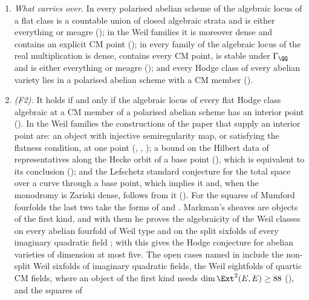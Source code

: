 \begin{theorem}\label{thm:twostand}
\leavevmode
\begin{enumerate}[label=\textup{(\roman*)},leftmargin=2.6em,itemsep=3pt]
\item \emph{What carries over.} In every polarised abelian scheme of
   the algebraic locus of a flat class is a
  countable union of closed algebraic strata and is either everything or
  meagre (); in the Weil families it is moreover dense
  and contains an explicit CM point (\cite[Theorem~1.1]{paperI}); in every family of
   the algebraic locus of the real multiplication is dense,
  contains every CM point, is stable under $\Gamma_{\QQ}$ and is either
  everything or meagre (); and every Hodge class of every
  abelian variety lies in a polarised abelian scheme with a CM member
  ().
\item \emph{(F2).} It holds if and only if the algebraic locus of every flat
  Hodge class algebraic at a CM member of a polarised abelian scheme has an
  interior point (). In the Weil families the
  constructions of the paper that supply an interior point are: an object
  with injective semiregularity map, or satisfying the flatness condition,
  at one point (\cite[Theorem~2.3]{paperII}, \cite[Theorem~17.7]{paperI},
  \cite[Proposition~3.15]{paperII}); a bound on the Hilbert data of representatives along
  the Hecke orbit of a base point (\cite[Theorem~16.9]{paperI}), which is
  equivalent to its conclusion (\cite[Theorem~16.17]{paperI}); and the Lefschetz
  standard conjecture for the total space over a curve through a base point,
  which implies it and, when the monodromy is Zariski dense, follows from it
  (). For the squares of Mumford fourfolds the last two
  take the forms of  and .
  Markman's sheaves are objects of the first kind, and with them he proves
  the algebraicity of the Weil classes on every abelian fourfold of Weil
  type and on the split sixfolds of every imaginary quadratic field
  \cite{Mar25a,Mar25b}; with \cite{MZ99} this gives the Hodge conjecture for
  abelian varieties of dimension at most five. The open cases named in
   include the non-split Weil sixfolds of imaginary
  quadratic fields, the Weil eightfolds of quartic CM fields, where an
  object of the first kind needs
  $\dim\Ext^{2}(E,E)\ge88$ (\cite[Corollary~5.15]{paperII}), and the squares of

\end{enumerate}
\end{theorem}
